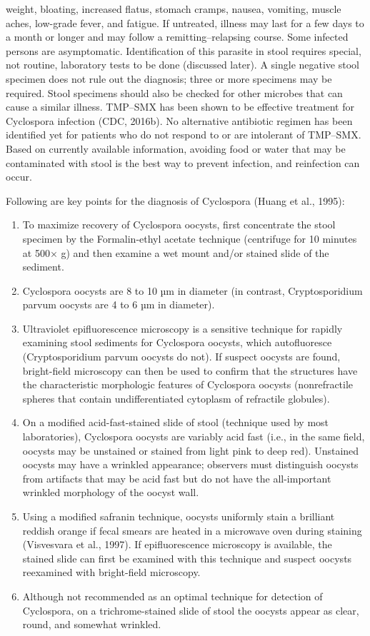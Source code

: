 \documentclass{article}
\begin{document}
weight, bloating, increased flatus, stomach cramps, nausea, vomiting,
muscle aches, low-grade fever, and fatigue. If untreated, illness may
last for a few days to a month or longer and may follow a
remitting--relapsing course. Some infected persons are asymptomatic.
Identification of this parasite in stool requires special, not routine,
laboratory tests to be done (discussed later). A single negative stool
specimen does not rule out the diagnosis; three or more specimens may be
required. Stool specimens should also be checked for other microbes that
can cause a similar illness. TMP--SMX has been shown to be effective
treatment for Cyclospora infection (CDC, 2016b). No alternative
antibiotic regimen has been identified yet for patients who do not
respond to or are intolerant of TMP--SMX. Based on currently available
information, avoiding food or water that may be contaminated with stool
is the best way to prevent infection, and reinfection can occur.

Following are key points for the diagnosis of Cyclospora (Huang et al.,
1995):

\begin{enumerate}

\item
  To maximize recovery of Cyclospora oocysts, first concentrate the
  stool specimen by the Formalin-ethyl acetate technique (centrifuge for
  10 minutes at 500× g) and then examine a wet mount and/or stained
  slide of the sediment.
\item
  Cyclospora oocysts are 8 to 10 µm in diameter (in contrast,
  Cryptosporidium parvum oocysts are 4 to 6 µm in diameter).
\item
  Ultraviolet epifluorescence microscopy is a sensitive technique for
  rapidly examining stool sediments for Cyclospora oocysts, which
  autofluoresce (Cryptosporidium parvum oocysts do not). If suspect
  oocysts are found, bright-field microscopy can then be used to confirm
  that the structures have the characteristic morphologic features of
  Cyclospora oocysts (nonrefractile spheres that contain
  undifferentiated cytoplasm of refractile globules).
\item
  On a modified acid-fast-stained slide of stool (technique used by most
  laboratories), Cyclospora oocysts are variably acid fast (i.e., in the
  same field, oocysts may be unstained or stained from light pink to
  deep red). Unstained oocysts may have a wrinkled appearance; observers
  must distinguish oocysts from artifacts that may be acid fast but do
  not have the all-important wrinkled morphology of the oocyst wall.
\item
  Using a modified safranin technique, oocysts uniformly stain a
  brilliant reddish orange if fecal smears are heated in a microwave
  oven during staining (Visvesvara et al., 1997). If epifluorescence
  microscopy is available, the stained slide can first be examined with
  this technique and suspect oocysts reexamined with bright-field
  microscopy.
\item
  Although not recommended as an optimal technique for detection of
  Cyclospora, on a trichrome-stained slide of stool the oocysts appear
  as clear, round, and somewhat wrinkled.
\end{enumerate}
\end{document}
